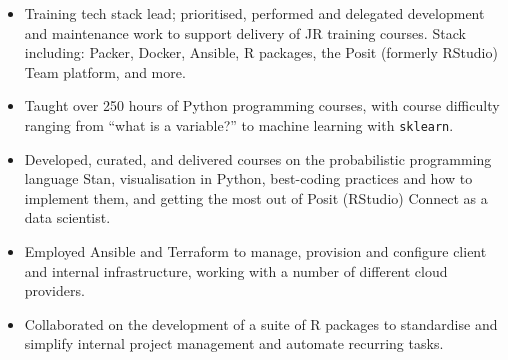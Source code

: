 \documentclass[12pt, a4paper]{article}
\begin{document}
\vspace{-.4em}


\begin{itemize}[
    itemsep=.05em,
    labelwidth=2em,
    leftmargin=1.5em,
    topsep=0em]

    \item[] %
                   {Training tech stack lead; prioritised, performed and delegated development
                    and maintenance work to support delivery of JR training courses. Stack
                    including: Packer, Docker, Ansible, R packages, the Posit (formerly RStudio)
                    Team platform, and more.}

    \item[] 
                   {Taught over 250 hours of Python programming courses, with course difficulty
                    ranging from ``what is a variable?'' to machine learning with \texttt{sklearn}.}%

    \item[] 
                   {Developed, curated, and delivered courses on the probabilistic programming
                    language Stan, visualisation in Python, best-coding practices and how to
                    implement them, and getting the most out of Posit (RStudio) Connect as a data
                    scientist.}%

    \item[] 
                   {Employed Ansible and Terraform to manage, provision and configure client and
                    internal infrastructure, working with a number of different cloud providers.}%

    \item[] 
                   {Collaborated on the development of a suite of R packages to standardise and
                    simplify internal project management and automate recurring tasks.}

\end{itemize}


\clearpage

\end{document}
